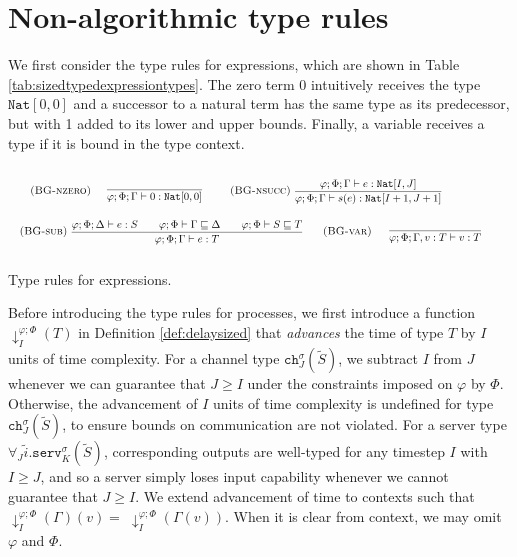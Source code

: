 \section{Non-algorithmic type rules}

We first consider the type rules for expressions, which are shown in Table \ref{tab:sizedtypedexpressiontypes}. The zero term $0$ intuitively receives the type $\texttt{Nat}[0,0]$ and a successor to a natural term has the same type as its predecessor, but with 1 added to its lower and upper bounds. Finally, a variable receives a type if it is bound in the type context.\\

\begin{table*}[ht]
    \begin{framed}\vspace{-1em}\begin{align*}
        &\kern2em
        \runa{BG-nzero}\;\infrule{}{\varphi;\Phi;\Gamma\vdash\withtype{0}{\typenat[0,0]}}\kern0em
        \runa{BG-nsucc}\;\infrule{\varphi;\Phi;\Gamma \vdash \withtype{e}{\typenat[I, J]}}{\varphi;\Phi;\Gamma \vdash \withtype{\succc{e}}{\typenat[I + 1, J + 1]}}\\[-1em]
        &\kern1em\runa{BG-sub}\;\infrule{\varphi;\Phi;\Delta\vdash e : S\quad\quad \varphi;\Phi\vdash \Gamma\sqsubseteq \Delta\quad\quad \varphi;\Phi\vdash S \sqsubseteq T}{\varphi;\Phi;\Gamma\vdash e : T}\kern11em\runa{BG-var}\;\infrule{}{\varphi;\Phi;\Gamma, \withtype{v}{T} \vdash \withtype{v}{T}}
    \end{align*}\vspace{-1em}\end{framed}
    \smallskip
    \caption{Type rules for expressions.}
    \label{tab:sizedtypedexpressiontypes}
\end{table*}

Before introducing the type rules for processes, we first introduce a function $\downarrow^{\varphi;\Phi}_I\!\!(T)$ in Definition \ref{def:delaysized} that \textit{advances} the time of type $T$ by $I$ units of time complexity. For a channel type $\texttt{ch}^\sigma_J(\widetilde{S})$, we subtract $I$ from $J$ whenever we can guarantee that $J\geq I$ under the constraints imposed on $\varphi$ by $\Phi$. Otherwise, the advancement of $I$ units of time complexity is undefined for type $\texttt{ch}^\sigma_J(\widetilde{S})$, to ensure bounds on communication are not violated. For a server type $\forall_J\widetilde{i}.\texttt{serv}^\sigma_K(\widetilde{S})$, corresponding outputs are well-typed for any timestep $I$ with $I\geq J$, and so a server simply loses input capability whenever we cannot guarantee that $J \geq I$. We extend advancement of time to contexts such that $\downarrow^{\varphi;\Phi}_I(\Gamma)(v)=\;\downarrow^{\varphi;\Phi}_I(\Gamma(v))$. When it is clear from context, we may omit $\varphi$ and $\Phi$.

